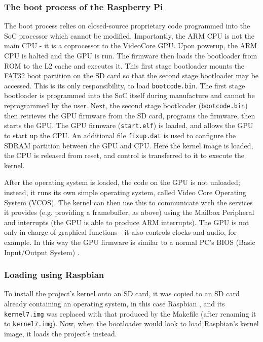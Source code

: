\documentclass[10pt,a4paper]{article}
\newcommand{\code}[1]{\texttt{#1}}
\begin{document}
\subsubsection*{The boot process of the Raspberry Pi}
The boot process relies on closed-source proprietary code programmed into the
SoC processor \cite{Firmware} which cannot be modified. Importantly, the ARM CPU
is not the main CPU - it is a coprocessor to the VideoCore GPU. Upon powerup,
the ARM CPU is halted and the GPU is run. The firmware then loads the bootloader
from ROM to the L2 cache and executes it.  This first stage bootloader mounts
the FAT32 boot partition on the SD card so that the second stage bootloader may
be accessed.  This is its only responsibility, to load \code{bootcode.bin}. The
first stage bootloader is programmed into the SoC itself during manufacture and
cannot be reprogrammed by the user.  Next, the second stage bootloader
(\code{bootcode.bin}) then retrieves the GPU firmware from the SD card, programs
the firmware, then starts the GPU. The GPU firmware (\code{start.elf}) is
loaded, and allows the GPU to start up the CPU. An additional file
\code{fixup.dat} is used to configure the SDRAM partition between the GPU and
CPU.  Here the kernel image is loaded, the CPU is released from reset, and
control is transferred to it to execute the kernel.

After the operating system is loaded, the code on the GPU is not unloaded;
instead, it runs its own simple operating system, called Video Core Operating
System (VCOS). The kernel can then use this to communicate with the services it
provides (e.g. providing a framebuffer, as above) using the Mailbox Peripheral
and interrupts (the GPU is able to produce ARM interrupts). The GPU is not only
in charge of graphical functions - it also controls clocks and audio, for
example. In this way the GPU firmware is similar to a normal PC's BIOS (Basic
Input/Output System) \cite{Boot1, Boot2}.

\subsubsection*{Loading using Raspbian}
To install the project's kernel onto an SD card, it was copied to an SD card
already containing an operating system, in this case Raspbian \cite{Raspbian},
and its \code{kernel7.img} was replaced with that produced by the Makefile
(after renaming it to \code{kernel7.img}). Now, when the bootloader would look
to load Raspbian's kernel image, it loads the project's instead.
\end{document}
